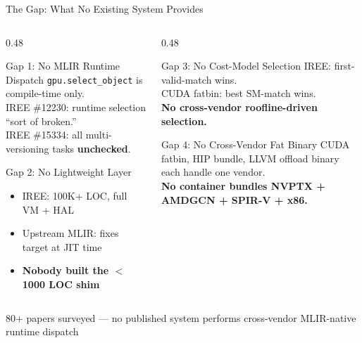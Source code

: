 \documentclass[aspectratio=169,10pt]{beamer}
\begin{document}
\begin{frame}{The Gap: What No Existing System Provides}
  \begin{columns}[T]
    \begin{column}{0.48\textwidth}
      \begin{alertblock}{Gap 1: No MLIR Runtime Dispatch}
        \texttt{gpu.select\_object} is compile-time only.\\
        IREE \#12230: runtime selection ``sort of broken.''\\
        IREE \#15334: all multi-versioning tasks \textbf{unchecked}.
      \end{alertblock}
      \begin{alertblock}{Gap 2: No Lightweight Layer}
        \begin{itemize}
          \item IREE: 100K+ LOC, full VM + HAL
          \item Upstream MLIR: fixes target at JIT time
          \item \textbf{Nobody built the $<$1000 LOC shim}
        \end{itemize}
      \end{alertblock}
    \end{column}
    \begin{column}{0.48\textwidth}
      \begin{alertblock}{Gap 3: No Cost-Model Selection}
        IREE: first-valid-match wins.\\
        CUDA fatbin: best SM-match wins.\\
        \textbf{No cross-vendor roofline-driven selection.}
      \end{alertblock}
      \begin{alertblock}{Gap 4: No Cross-Vendor Fat Binary}
        CUDA fatbin, HIP bundle, LLVM offload binary each handle one vendor.\\
        \textbf{No container bundles NVPTX + AMDGCN + SPIR-V + x86.}
      \end{alertblock}
    \end{column}
  \end{columns}
  \vspace{0.5em}
  \begin{center}
    {\small\color{LLVMgray} 80+ papers surveyed --- no published system performs cross-vendor MLIR-native runtime dispatch}
  \end{center}
\end{frame}
\end{document}
